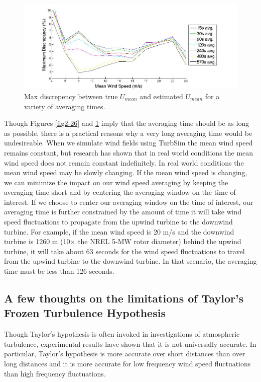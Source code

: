 \begin{figure}[ht]
	\centering
		\includegraphics[width = \linewidth]{Figures/ch2Figures/fig2-27.jpg}
		
	\caption{Max discrepency between true $U_{mean}$ and estimated $U_{mean}$ for a variety of averaging times.}
	\label{fig2-27}
\end{figure}

Though Figures  \ref{fig2-26} and \ref{fig2-27} imply that the averaging time should be as long as possible, there is a practical reasons why a very long averaging time would be undesireable. When we simulate wind fields using TurbSim the mean wind speed remains constant, but research has shown that in real world conditions the mean wind speed does not remain constant indefinitely. In real world conditions the mean wind speed may be slowly changing.\cite{vanderhoven1957} If the mean wind speed is changing, we can minimize the impact on our wind speed averaging by keeping the averaging time short and by centering the averaging window on the time of interest. If we choose to center our averaging window on the time of interest, our averaging time is further constrained by the amount of time it will take wind speed fluctuations to propagate from the upwind turbine to the downwind turbine. For example, if the mean wind speed is 20 m/s and the downwind turbine is 1260 m (10$\times$ the NREL 5-MW rotor diameter) behind the upwind turbine, it will take about 63 seconds for the wind speed fluctuations to travel from the upwind turbine to the downwind turbine. In that scenario, the averaging time must be less than 126 seconds.

\subsection{A few thoughts on the limitations of Taylor's Frozen Turbulence Hypothesis}
Though Taylor$'$s hypothesis is often invoked in investigations of atmospheric turbulence, experimental results have shown that it is not universally accurate.  In particular, Taylor$'$s hypothesis is more accurate over short distances than over long distances and it is more accurate for low frequency wind speed fluctuations than high frequency fluctuations.\cite{higgins2012, schlipf2010}

